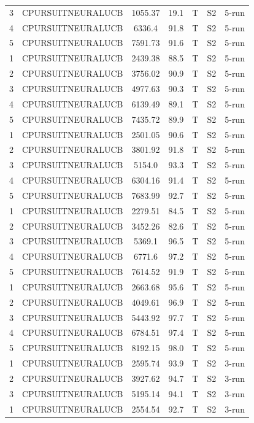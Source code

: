 \documentclass[11pt]{article}
\begin{document}
\begin{center}
\begin{longtable}{|c|c|c|c|c|c|c|}
3 & CPURSUITNEURALUCB & 1055.37 & 19.1 & T & S2 & 5-run \\
4 & CPURSUITNEURALUCB & 6336.4 & 91.8 & T & S2 & 5-run \\
5 & CPURSUITNEURALUCB & 7591.73 & 91.6 & T & S2 & 5-run \\
1 & CPURSUITNEURALUCB & 2439.38 & 88.5 & T & S2 & 5-run \\
2 & CPURSUITNEURALUCB & 3756.02 & 90.9 & T & S2 & 5-run \\
3 & CPURSUITNEURALUCB & 4977.63 & 90.3 & T & S2 & 5-run \\
4 & CPURSUITNEURALUCB & 6139.49 & 89.1 & T & S2 & 5-run \\
5 & CPURSUITNEURALUCB & 7435.72 & 89.9 & T & S2 & 5-run \\
1 & CPURSUITNEURALUCB & 2501.05 & 90.6 & T & S2 & 5-run \\
2 & CPURSUITNEURALUCB & 3801.92 & 91.8 & T & S2 & 5-run \\
3 & CPURSUITNEURALUCB & 5154.0 & 93.3 & T & S2 & 5-run \\
4 & CPURSUITNEURALUCB & 6304.16 & 91.4 & T & S2 & 5-run \\
5 & CPURSUITNEURALUCB & 7683.99 & 92.7 & T & S2 & 5-run \\
1 & CPURSUITNEURALUCB & 2279.51 & 84.5 & T & S2 & 5-run \\
2 & CPURSUITNEURALUCB & 3452.26 & 82.6 & T & S2 & 5-run \\
3 & CPURSUITNEURALUCB & 5369.1 & 96.5 & T & S2 & 5-run \\
4 & CPURSUITNEURALUCB & 6771.6 & 97.2 & T & S2 & 5-run \\
5 & CPURSUITNEURALUCB & 7614.52 & 91.9 & T & S2 & 5-run \\
1 & CPURSUITNEURALUCB & 2663.68 & 95.6 & T & S2 & 5-run \\
2 & CPURSUITNEURALUCB & 4049.61 & 96.9 & T & S2 & 5-run \\
3 & CPURSUITNEURALUCB & 5443.92 & 97.7 & T & S2 & 5-run \\
4 & CPURSUITNEURALUCB & 6784.51 & 97.4 & T & S2 & 5-run \\
5 & CPURSUITNEURALUCB & 8192.15 & 98.0 & T & S2 & 5-run \\
1 & CPURSUITNEURALUCB & 2595.74 & 93.9 & T & S2 & 3-run \\
2 & CPURSUITNEURALUCB & 3927.62 & 94.7 & T & S2 & 3-run \\
3 & CPURSUITNEURALUCB & 5195.14 & 94.1 & T & S2 & 3-run \\
1 & CPURSUITNEURALUCB & 2554.54 & 92.7 & T & S2 & 3-run \\

\end{longtable}
\end{center}
\end{document}
